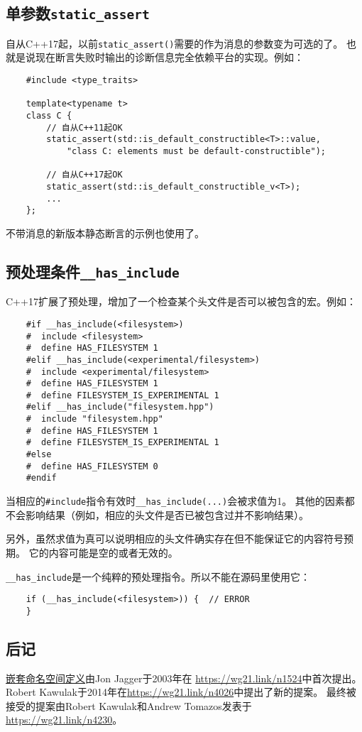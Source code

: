 \subsection{单参数\texttt{static\_assert}}\label{ch8.8}
自从C++17起，以前\texttt{static\_assert()}需要的作为消息的参数变为可选的了。
也就是说现在断言失败时输出的诊断信息完全依赖平台的实现。例如：
\begin{lstlisting}
    #include <type_traits>

    template<typename t>
    class C {
        // 自从C++11起OK
        static_assert(std::is_default_constructible<T>::value,
            "class C: elements must be default-constructible");

        // 自从C++17起OK
        static_assert(std::is_default_constructible_v<T>);
        ...
    };
\end{lstlisting}
不带消息的新版本静态断言的示例也使用了。

\subsection{预处理条件\texttt{\_\_has\_include}}\label{ch8.9}
C++17扩展了预处理，增加了一个检查某个头文件是否可以被包含的宏。例如：
\begin{lstlisting}
    #if __has_include(<filesystem>)
    #  include <filesystem>
    #  define HAS_FILESYSTEM 1
    #elif __has_include(<experimental/filesystem>)
    #  include <experimental/filesystem>
    #  define HAS_FILESYSTEM 1
    #  define FILESYSTEM_IS_EXPERIMENTAL 1
    #elif __has_include("filesystem.hpp")
    #  include "filesystem.hpp"
    #  define HAS_FILESYSTEM 1
    #  define FILESYSTEM_IS_EXPERIMENTAL 1
    #else
    #  define HAS_FILESYSTEM 0
    #endif
\end{lstlisting}
当相应的\texttt{\#include}指令有效时\texttt{\_\_has\_include(...)}会被求值为1。
其他的因素都不会影响结果（例如，相应的头文件是否已被包含过并不影响结果）。

另外，虽然求值为真可以说明相应的头文件确实存在但不能保证它的内容符号预期。
它的内容可能是空的或者无效的。

\texttt{\_\_has\_include}是一个纯粹的预处理指令。所以不能在源码里使用它：
\begin{lstlisting}
    if (__has_include(<filesystem>)) {  // ERROR
    }
\end{lstlisting}

\subsection{后记}
\hyperref[ch8.1]{嵌套命名空间定义}由Jon Jagger于2003年在
\url{https://wg21.link/n1524}中首次提出。
Robert Kawulak于2014年在\url{https://wg21.link/n4026}中提出了新的提案。
最终被接受的提案由Robert Kawulak和Andrew Tomazos发表于\url{https://wg21.link/n4230}。

